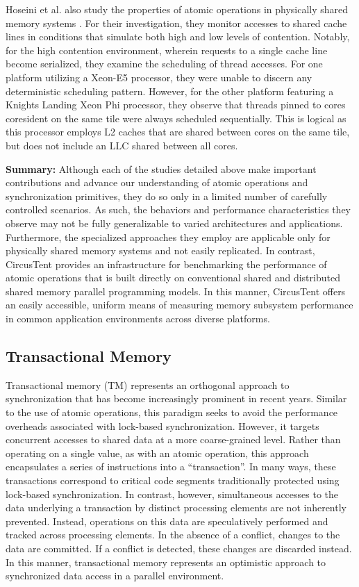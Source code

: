 Hoseini et al. also study the properties of atomic operations in physically shared memory systems \cite{hoseini2019modeling}.
For their investigation, they monitor accesses to shared cache lines in conditions that simulate both high and low levels of contention.
Notably, for the high contention environment, wherein requests to a single cache line become serialized, they examine the scheduling of thread accesses.
For one platform utilizing a Xeon-E5 processor, they were unable to discern any deterministic scheduling pattern.
However, for the other platform featuring a Knights Landing Xeon Phi processor, they observe that threads pinned to cores coresident on the same tile were always scheduled sequentially.
This is logical as this processor employs L2 caches that are shared between cores on the same tile, but does not include an LLC shared between all cores.

\textbf{Summary:} Although each of the studies detailed above make important contributions and advance our understanding of atomic operations and synchronization primitives, they do so only in a limited number of carefully controlled scenarios.
As such, the behaviors and performance characteristics they observe may not be fully generalizable to varied architectures and applications.
Furthermore, the specialized approaches they employ are applicable only for physically shared memory systems and not easily replicated.
In contrast, CircusTent provides an infrastructure for benchmarking the performance of atomic operations that is built directly on conventional shared and distributed shared memory parallel programming models.
In this manner, CircusTent offers an easily accessible, uniform means of measuring memory subsystem performance in common application environments across diverse platforms.

\subsection{Transactional Memory}
\label{subsec:trans_mem}

Transactional memory (TM) represents an orthogonal approach to synchronization that has become increasingly prominent in recent years.
Similar to the use of atomic operations, this paradigm seeks to avoid the performance overheads associated with lock-based synchronization.
However, it targets concurrent accesses to shared data at a more coarse-grained level. 
Rather than operating on a single value, as with an atomic operation, this approach encapsulates a series of instructions into a ``transaction''.
In many ways, these transactions correspond to critical code segments traditionally protected using lock-based synchronization.
In contrast, however, simultaneous accesses to the data underlying a transaction by distinct processing elements are not inherently prevented.
Instead, operations on this data are speculatively performed and tracked across processing elements.
In the absence of a conflict, changes to the data are committed.
If a conflict is detected, these changes are discarded instead.
In this manner, transactional memory represents an optimistic approach to synchronized data access in a parallel environment.

